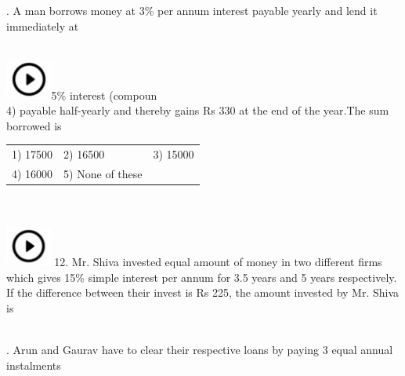 \documentclass{article}
\begin{document}
	\noindent 
	
\newpage
	
	. A man borrows money at 3\% per annum interest payable yearly and lend it immediately at
	
	\noindent  
	 
	\noindent \\ \includegraphics*[width=0.60in, height=0.52in]{images/image1}5\% interest (compoun\\
4) payable half-yearly and thereby gains Rs 330 at the end of the year.The sum borrowed is
	
	\noindent 
	
	\noindent \begin{tabular}{p{1.7in} p{1.6in} p{1.6in}} \\ 
 1) 17500                  & 2) 16500           & 3) 15000           \\
4) 16000           & 5) None of these  \\
\end{tabular}
	
	\noindent 
	
	\noindent 
	
	\noindent 
	
	\noindent 
	
	\noindent 
	
	\noindent   \\ 
	 
	\noindent \\ \includegraphics*[width=0.59in, height=0.52in]{images/image1} 12. Mr. Shiva invested equal amount of money in two different firms which gives 15\% simple interest per annum for 3.5 years and 5 years respectively. If the difference between their invest is Rs 225, the amount invested by Mr. Shiva is
	
	\noindent 
	
	\noindent  \\ 
	
	. Arun and Gaurav have to clear their respective loans by paying 3 equal annual instalments
	
	\noindent  
	 
\end{document}
